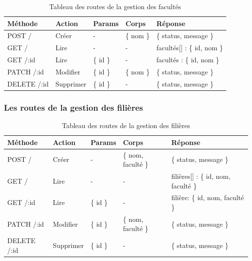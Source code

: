 \begin{table}[ht]
  \caption{Tableau des routes de la gestion des facultés}
  \label{tab:routes-fac}
  \begin{tabular}{|p{1.5cm}|p{1.5cm}|p{1.5cm}|p{1.5cm}|p{4cm}|}
    \hline
          Méthode & Action & Params & Corps & Réponse \\
      \hline
          POST /  & Créer &  - & \{ nom \} & \{ status, message \} \\
      \hline
          GET  / & Lire  & - & - & facultés[] : \{ id, nom \}  \\
      \hline
          GET /:id  & Lire  & \{ id \} & - & facultés : \{ id, nom \}  \\
      \hline
          PATCH  /:id  & Modifier & \{ id \} & \{ nom \} & \{ status, message \} \\
      \hline
          DELETE  /:id  & Supprimer & \{ id \} & - & \{ status, message \} \\
      \hline
  \end{tabular}
\end{table}
\pagebreak

\subsubsection*{Les routes de la gestion des filières}\label{subsec:routes-field}

\begin{table}[ht]
  \caption{Tableau des routes de la gestion des filières}
  \label{tab:routes-field}
  \begin{tabular}{|p{1.5cm}|p{1.5cm}|p{1.5cm}|p{2.5cm}|p{3cm}|}
    \hline
      Méthode & Action & Params & Corps & Réponse \\
    \hline
        POST / & Créer &  - & \{ nom, faculté \} & \{ status, message \} \\
    \hline
        GET / & Lire & - & - & filières[] : \{ id, nom, faculté \}  \\
    \hline
        GET /:id & Lire & \{ id \} & - & filière: \{ id, nom, faculté \} \\
    \hline
        PATCH /:id & Modifier & \{ id \} & \{ nom, faculté \} & \{ status, message \} \\
    \hline
        DELETE /:id & Supprimer & \{ id \} & - & \{ status, message \} \\
    \hline
  \end{tabular}
\end{table}
\pagebreak

